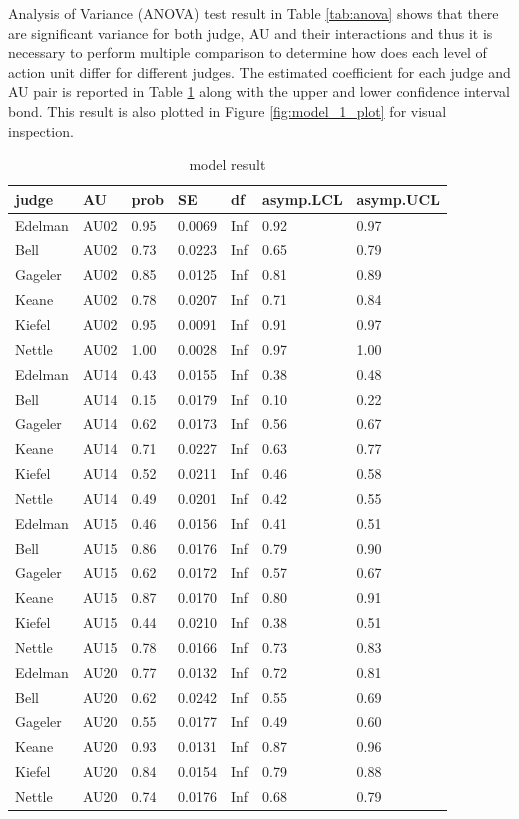 \documentclass{monashthesis}
\begin{document}
Analysis of Variance (ANOVA) test result in Table \ref{tab:anova} shows that there are significant variance for both judge, AU and their interactions and thus it is necessary to perform multiple comparison to determine how does each level of action unit differ for different judges. The estimated coefficient for each judge and AU pair is reported in Table \ref{tab:result_1} along with the upper and lower confidence interval bond. This result is also plotted in Figure \ref{fig:model_1_plot} for visual inspection.

\begin{table}[ht]
\begin{center}
\caption{\label{tab:result_1} model result}
\begin{tabular}{lllllll}
\toprule
judge & AU & prob & SE & df & asymp.LCL & asymp.UCL \\
\midrule
Edelman & AU02 & 0.95 & 0.0069 & Inf & 0.92 & 0.97 \\
Bell & AU02 & 0.73 & 0.0223 & Inf & 0.65 & 0.79 \\
Gageler & AU02 & 0.85 & 0.0125 & Inf & 0.81 & 0.89 \\
Keane & AU02 & 0.78 & 0.0207 & Inf & 0.71 & 0.84 \\
Kiefel & AU02 & 0.95 & 0.0091 & Inf & 0.91 & 0.97 \\
Nettle & AU02 & 1.00 & 0.0028 & Inf & 0.97 & 1.00 \\
Edelman & AU14 & 0.43 & 0.0155 & Inf & 0.38 & 0.48 \\
Bell & AU14 & 0.15 & 0.0179 & Inf & 0.10 & 0.22 \\
Gageler & AU14 & 0.62 & 0.0173 & Inf & 0.56 & 0.67 \\
Keane & AU14 & 0.71 & 0.0227 & Inf & 0.63 & 0.77 \\
Kiefel & AU14 & 0.52 & 0.0211 & Inf & 0.46 & 0.58 \\
Nettle & AU14 & 0.49 & 0.0201 & Inf & 0.42 & 0.55 \\
Edelman & AU15 & 0.46 & 0.0156 & Inf & 0.41 & 0.51 \\
Bell & AU15 & 0.86 & 0.0176 & Inf & 0.79 & 0.90 \\
Gageler & AU15 & 0.62 & 0.0172 & Inf & 0.57 & 0.67 \\
Keane & AU15 & 0.87 & 0.0170 & Inf & 0.80 & 0.91 \\
Kiefel & AU15 & 0.44 & 0.0210 & Inf & 0.38 & 0.51 \\
Nettle & AU15 & 0.78 & 0.0166 & Inf & 0.73 & 0.83 \\
Edelman & AU20 & 0.77 & 0.0132 & Inf & 0.72 & 0.81 \\
Bell & AU20 & 0.62 & 0.0242 & Inf & 0.55 & 0.69 \\
Gageler & AU20 & 0.55 & 0.0177 & Inf & 0.49 & 0.60 \\
Keane & AU20 & 0.93 & 0.0131 & Inf & 0.87 & 0.96 \\
Kiefel & AU20 & 0.84 & 0.0154 & Inf & 0.79 & 0.88 \\
Nettle & AU20 & 0.74 & 0.0176 & Inf & 0.68 & 0.79 \\
\bottomrule
\end{tabular}
\end{center}
\end{table}
\end{document}
